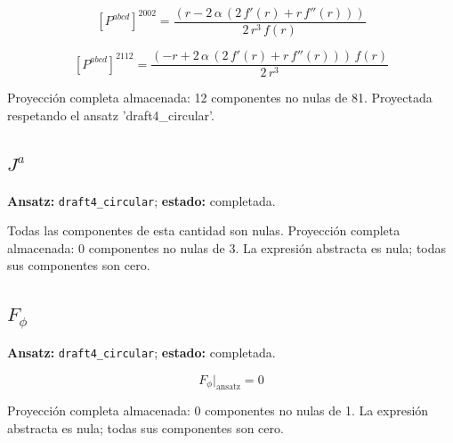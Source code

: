 \documentclass[11pt]{article}
\begin{document}
\begin{dmath*}[breakdepth={5}]
\left[P^{abcd}\right]^{2002} = \frac{\left(r - 2\,\alpha\,\left(2\,f'\!\left(r\right) + r\,f''\!\left(r\right)\right)\right)}{2\,{r}^{3}\,f\!\left(r\right)}
\end{dmath*}
\par\smallskip
\begin{dmath*}[breakdepth={5}]
\left[P^{abcd}\right]^{2112} = \frac{\left(-r + 2\,\alpha\,\left(2\,f'\!\left(r\right) + r\,f''\!\left(r\right)\right)\right)\,f\!\left(r\right)}{2\,{r}^{3}}
\end{dmath*}
\par\smallskip
Proyección completa almacenada: 12 componentes no nulas de 81. Proyectada respetando el ansatz 'draft4\_circular'.\par\medskip
{}
\subsection*{$ J^a $}
\textbf{Ansatz:} \texttt{draft4\_circular}; \textbf{estado:} completada.\par
Todas las componentes de esta cantidad son nulas.
Proyección completa almacenada: 0 componentes no nulas de 3. La expresión abstracta es nula; todas sus componentes son cero.\par\medskip
{}
\subsection*{$ F_{\phi} $}
\textbf{Ansatz:} \texttt{draft4\_circular}; \textbf{estado:} completada.\par
\begin{dmath*}[breakdepth={5}]
F_{\phi}\big|_{\mathrm{ansatz}} = 0
\end{dmath*}
\par\smallskip
Proyección completa almacenada: 0 componentes no nulas de 1. La expresión abstracta es nula; todas sus componentes son cero.\par\medskip
{}
\end{document}
